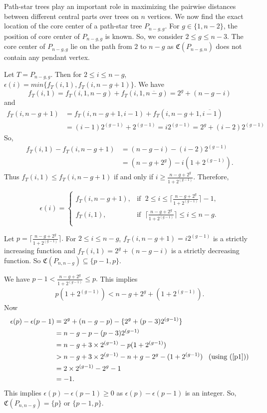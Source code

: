 \documentclass[11pt]{article}
\begin{document}
Path-star trees play an important role in maximizing the pairwise distances between different central parts over trees on $n$ vertices. We  now  find the exact location of the core center of a path-star tree $P_{n-g,g}$. For $g\in\{1,n-2\}$, the position of core center of $P_{n-g,g}$ is known. So, we consider $2\leq g \leq n-3$. The core center of $P_{n-g,g}$ lie on the path from $2$ to $n-g$ as $\mathfrak{C}(P_{n-g,n})$ does not contain any pendant vertex. 

Let $T=P_{n-g,g}$. Then for $2\leq i\leq n-g$, $\epsilon(i)=min\{f_T(i,1),f_T(i, n-g+1)\}$. We have 
$$f_T(i,1)=f_T(i,1,n-g)+f_T(i,1,\overline{n-g})=2^g+(n-g-i)$$ and 
\begin{align*}
  f_T(i,n-g+1)&=f_T(i,n-g+1,i-1)+f_T(i,n-g+1,\overline{i-1})\\
              &=(i-1)2^{(g-1)}+2^{(g-1)}=i2^{(g-1)}=2^g+(i-2)2^{(g-1)}
\end{align*}
So, 
\begin{align*}
f_T(i,1)-f_T(i,n-g+1)&=(n-g-i)-(i-2)2^{(g-1)}\\
                     &=(n-g+2^g)-i(1+2^{(g-1)}). 
\end{align*}
 Thus $f_T(i,1)\leq f_T(i,n-g+1)$ if and only if $i \geq \frac{n-g+2^g}{1+2^{(g-1)}}$. Therefore,

$$\epsilon(i)= \left\{
\begin{array}{ll}
    
    f_T(i,n-g+1), & \text{if } \; 2\leq i \leq \lceil \frac{n-g+2^g}{1+2^{(g-1)}} \rceil-1,\\
    f_T(i,1), & \text{if }\; \lceil \frac{n-g+2^g}{1+2^{(g-1)}} \rceil  \leq i \leq n-g .\\
\end{array}
\right.$$


Let $p= \lceil \frac{n-g+2^g}{1+2^{(g-1)}} \rceil.$ For $2\leq i \leq n-g$, $f_T(i,n-g+1)=i2^{(g-1)}$ is a strictly increasing function and $f_T(i,1)=2^g+(n-g-i) $ is a strictly decreasing function. So $\mathfrak{C}(P_{n,n-g})\subseteq \{p-1,p\}.$

We have $p-1< \frac{n-g+2^g}{1+2^{(g-1)}}\leq p.$ This implies 
\begin{align}\label{p1}
   p(1+2^{(g-1)})<n-g+2^g+(1+2^{(g-1)}). 
\end{align}
Now 
\begin{align*}
  \epsilon(p)-\epsilon(p-1)&= 2^g+(n-g-p)-\{2^g+(p-3)2^{(g-1)}\}\\
                           &=n-g-p-(p-3)2^{(g-1)}\\
                           &=n-g+3\times 2^{(g-1)}-p(1+2^{(g-1)})\\
                           &>n-g+3\times 2^{(g-1)}-n+g-2^g-(1+2^{(g-1)})\;\;\;\mbox{(using (\ref{p1}))}\\
                           &=2\times 2^{(g-1)}-2^g-1\\
                           &=-1.
\end{align*}
This implies $\epsilon(p)-\epsilon(p-1)\geq 0$ as $\epsilon(p)-\epsilon(p-1)$ is an integer. So, $\mathfrak{C}(P_{n,n-g})=\{p\}$ or $\{p-1,p\}$.
 
\end{document}
